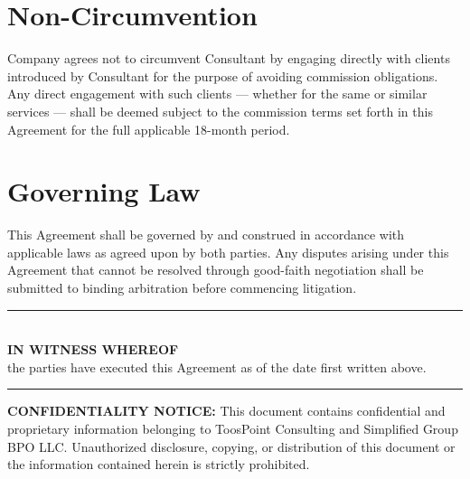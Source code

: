 \documentclass{toospoint}
\begin{document}
\section{Non-Circumvention}

Company agrees not to circumvent Consultant by engaging directly with clients
introduced by Consultant for the purpose of avoiding commission obligations. Any
direct engagement with such clients — whether for the same or similar services —
shall be deemed subject to the commission terms set forth in this Agreement for the
full applicable 18-month period.

\section{Governing Law}

This Agreement shall be governed by and construed in accordance with applicable
laws as agreed upon by both parties. Any disputes arising under this Agreement that
cannot be resolved through good-faith negotiation shall be submitted to binding
arbitration before commencing litigation.

\vspace{28pt}

\begin{center}
  {\color{TPBorder}\rule{0.7\textwidth}{0.5pt}}\\[6pt]
  {\sffamily\bfseries\color{TPDark}IN WITNESS WHEREOF}\\[4pt]
  {\sffamily\small\color{TPGray}the parties have executed this Agreement as of the date first written above.}\\[6pt]
  {\color{TPBorder}\rule{0.7\textwidth}{0.5pt}}
\end{center}

\vspace{20pt}

\noindent
{}
\hfill
{}

\vspace{32pt}

\begin{mdframed}[
  linecolor=TPBorder,
  linewidth=1pt,
  roundcorner=4pt,
  backgroundcolor=TPLight,
  innerleftmargin=14pt,
  innerrightmargin=14pt,
  innertopmargin=10pt,
  innerbottommargin=10pt
]
\sffamily\footnotesize\color{TPGray}
\textbf{CONFIDENTIALITY NOTICE:} This document contains confidential and proprietary
information belonging to ToosPoint Consulting and Simplified Group BPO LLC. Unauthorized
disclosure, copying, or distribution of this document or the information contained herein
is strictly prohibited.
\end{mdframed}
\end{document}
